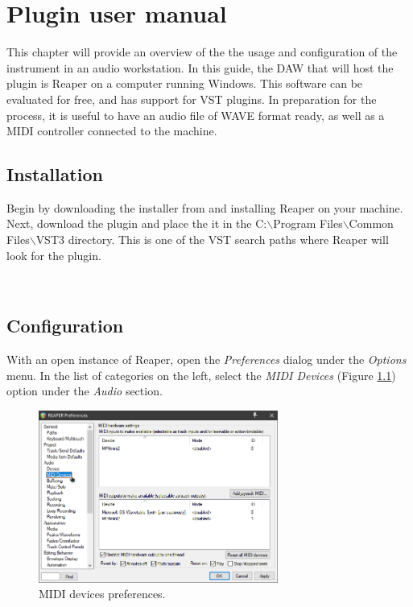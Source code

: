 \documentclass[12pt, a4paper, hidelinks]{report}
\begin{document}
	\newpage    
	\chapter{Plugin user manual}
	
	This chapter will provide an overview of the the usage and configuration of the instrument in an audio workstation. In this guide, the DAW that will host the plugin is Reaper \cite{reaper} on a computer running Windows. This software can be evaluated for free, and has support for VST plugins. In preparation for the process, it is useful to have an audio file of WAVE format ready, as well as a MIDI controller connected to the machine.
	~\\
	\section{Installation}
	Begin by downloading the installer from \cite{reaperdl} and installing Reaper on your machine. Next, download the plugin \cite{plugin} and place the it in the C:$\backslash$Program Files$\backslash$Common Files$\backslash$VST3 directory. This is one of the VST search paths where Reaper will look for the plugin.
	\par
	~\\
	
	\section{Configuration}
	With an open instance of Reaper, open the \textit{Preferences} dialog under the \textit{Options} menu. In the list of categories on the left, select the \textit{MIDI Devices} (Figure \ref{fig:udevoff}) option under the \textit{Audio} section. 
	\begin{figure}[h]
		\centering
		\includegraphics[width=0.7\textwidth]{u/dev_off.png}
		\caption{MIDI devices preferences.}
		\label{fig:udevoff}
	\end{figure}
	
\end{document}

